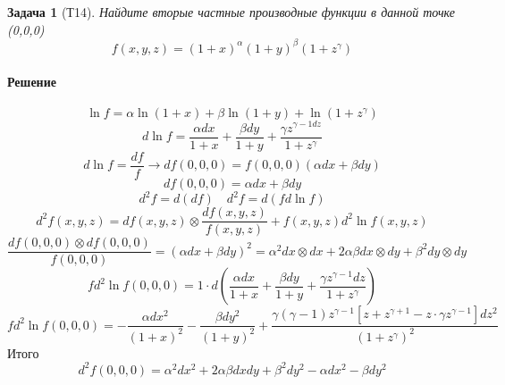\documentclass[a4paper,12pt]{report}
\newtheorem{problem}{Задача}[]
\newenvironment{sol}{\paragraph{Решение}}{}
\begin{document}
	
	\newpage
    
    \begin{problem}[Т14]
        Найдите вторые частные производные функции в данной точке (0,0,0)
        \begin{equation*}
            f(x,y,z)=(1+x)^{\alpha}(1+y)^{\beta}(1+z^\gamma)
        \end{equation*}
    \end{problem}
    \begin{sol}
        \begin{equation*}
            \ln f =\alpha \ln(1+x) + \beta \ln(1+y)+\ln(1+z^\gamma)
        \end{equation*}
        \begin{equation*}
            d\ln f=\frac{\alpha dx}{1+x}+\frac{\beta dy}{1+y}+\frac{\gamma z^{\gamma-1dz}}{1+z^\gamma}
        \end{equation*}
        \begin{equation*}
            d\ln f=\frac{df}{f}\rightarrow df(0,0,0)=f(0,0,0)(\alpha dx+\beta dy)
        \end{equation*}
        \begin{equation}
            df(0,0,0)=\alpha dx+\beta dy
        \end{equation}
        \begin{equation*}
            d^2f=d(df) \quad d^2f=d(fd\ln f)
        \end{equation*}
        \begin{equation*}
            d^2f(x,y,z)=df(x,y,z)\otimes\frac{df(x,y,z)}{f(x,y,z)}+f(x,y,z)d^2\ln f(x,y,z)
        \end{equation*}
        \begin{equation*}
            \frac{df(0,0,0)\otimes df(0,0,0)}{f(0,0,0)}=(\alpha dx+\beta dy)^2=\alpha^2dx\otimes dx+2\alpha \beta dx\otimes dy+\beta^2dy\otimes dy
        \end{equation*}
        \begin{equation*}
            fd^2\ln f(0,0,0)=1\cdot d\left(\frac{\alpha dx}{1+x}+\frac{\beta dy}{1+y}+\frac{\gamma z^{\gamma-1}dz}{1+z^\gamma} \right)
        \end{equation*}
        \begin{equation*}
            fd^2\ln f(0,0,0)=-\frac{\alpha dx^2}{(1+x)^2}-\frac{\beta dy^2}{(1+y)^2}+\frac{\gamma (\gamma-1)z^{\gamma-1}[z+z^{\gamma+1}-z\cdot\gamma z^{\gamma-1}]dz^2}{(1+z^\gamma)^2}
        \end{equation*}
        Итого
        \begin{equation*}
            d^2f(0,0,0)=\alpha^2dx^2+2\alpha\beta dxdy+\beta^2dy^2-\alpha dx^2 -\beta dy^2
        \end{equation*}
    \end{sol}
	
\end{document}

